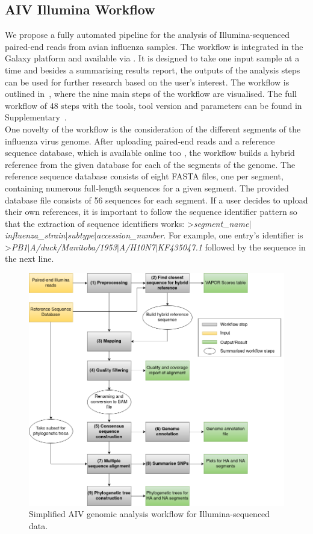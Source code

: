 \subsection{AIV Illumina Workflow}\label{sec:aiv-wf}
We propose a fully automated pipeline for the analysis of Illumina-sequenced paired-end reads from avian influenza samples. The workflow is integrated in the Galaxy platform and available via . It is designed to take one input sample at a time and besides a summarising results report, the outputs of the analysis steps can be used for further research based on the user's interest. The workflow is outlined in~, where the nine main steps of the workflow are visualised. The full workflow of 48 steps with the tools, tool version and parameters can be found in Supplementary~. \\
One novelty of the workflow is the consideration of the different segments of the influenza virus genome. After uploading paired-end reads and a reference sequence database, which is available online too , the workflow builds a hybrid reference from the given database for each of the segments of the genome. The reference sequence database consists of eight FASTA files, one per segment, containing numerous full-length sequences for a given segment. The provided database file consists of 56 sequences for each segment. If a user decides to upload their own references, it is important to follow the sequence identifier pattern so that the extraction of sequence identifiers works: >\textit{segment\_name$\mid$influenza\_strain$\mid$subtype$\mid$accession\_number}. For example, one entry's identifier is >\textit{PB1$\mid$A/duck/Manitoba/1953$\mid$A/H10N7$\mid$KF435047.1} followed by the sequence in the next line. 

\begin{figure}[ht!]
	\includegraphics[width=1\textwidth]{media/3-aiv.png}
	\caption{Simplified \ac{AIV} genomic analysis workflow for Illumina-sequenced data.}
	\label{fig:3-aiv-wf}
\end{figure}

